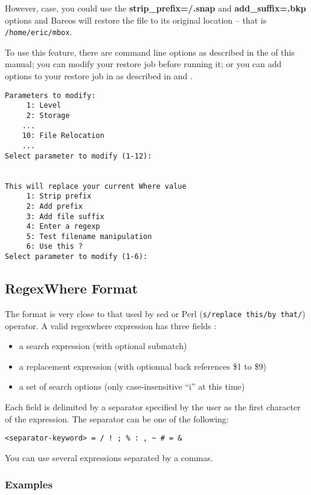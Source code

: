 However, case, you could use the
\textbf{strip\_prefix=/.snap} and \textbf{add\_suffix=.bkp} options and
Bareos will restore the file to its original location -- that is
\texttt{/home/eric/mbox}.

To use this feature, there are command line options as described in
the  of this manual;
you can modify your restore job before running it; or you can
add options to your restore job in as described in
 and .

\begin{verbatim}
Parameters to modify:
     1: Level
     2: Storage
    ...
    10: File Relocation
    ...
Select parameter to modify (1-12):


This will replace your current Where value
     1: Strip prefix
     2: Add prefix
     3: Add file suffix
     4: Enter a regexp
     5: Test filename manipulation
     6: Use this ?
Select parameter to modify (1-6):
\end{verbatim}


\subsection*{RegexWhere Format}
    \label{regexwhere}

The format is very close to that used by sed or Perl (\texttt{s/replace this/by
  that/}) operator. A valid regexwhere expression has three fields :
\begin{itemize}
\item a search expression (with optional submatch)
\item a replacement expression (with optionnal back references \$1 to \$9)
\item a set of search options (only case-insensitive ``i'' at this time)
\end{itemize}

Each field is delimited by a separator specified by the user as the first
character of the expression. The separator can be one of the following:
\begin{verbatim}
<separator-keyword> = / ! ; % : , ~ # = &
\end{verbatim}

You can use several expressions separated by a commas.

\subsubsection*{Examples}

